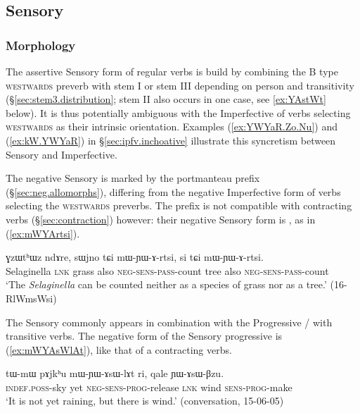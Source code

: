 \subsection{Sensory} \label{sec:sensory}

\subsubsection{Morphology} \label{sec:sensory.morphology}
The assertive Sensory form of regular verbs is build by combining the B type \textsc{westwards}  preverb with stem I or stem III depending on person and transitivity (§\ref{sec:stem3.distribution}; stem II also occurs in one case, see \ref{ex:YAstWt} below). It is thus potentially ambiguous with the Imperfective of verbs selecting \textsc{westwards} as their intrinsic orientation. Examples (\ref{ex:YWYaR.Zo.Nu}) and (\ref{ex:kW.YWYaR}) in §\ref{sec:ipfv.inchoative} illustrate this syncretism between Sensory and Imperfective.

The negative Sensory is marked by the portmanteau prefix  (§\ref{sec:neg.allomorphs}), differing from the negative Imperfective form  of verbs selecting the \textsc{westwards} preverbs. The  prefix is not compatible with contracting verbs (§\ref{sec:contraction}) however: their negative Sensory form is , as in (\ref{ex:mWYArtsi}).

\begin{exe}
\ex \label{ex:mWYArtsi}
\gll ɣzɯtʰɯz ndɤre, sɯjno tɕi mɯ-ɲɯ-ɤ-rtsi, si tɕi mɯ-ɲɯ-ɤ-rtsi. \\
Selaginella \textsc{lnk} grass also \textsc{neg}-\textsc{sens}-\textsc{pass}-count tree also \textsc{neg}-\textsc{sens}-\textsc{pass}-count \\
\glt `The \textit{Selaginella} can be counted neither as a species of grass nor as a tree.' (16-RlWmsWsi)
\end{exe}

The Sensory commonly appears in combination with the Progressive / with transitive verbs. The negative form of the Sensory progressive is  (\ref{ex:mWYAsWlAt}), like that of a contracting verbs.

\begin{exe}
\ex \label{ex:mWYAsWlAt}
\gll   tɯ-mɯ pɤjkʰu mɯ-ɲɯ-ɤsɯ-lɤt ri, qale ɲɯ-ɤsɯ-βzu.\\
\textsc{indef}.\textsc{poss}-sky yet \textsc{neg}-\textsc{sens}-\textsc{prog}-release \textsc{lnk} wind \textsc{sens}-\textsc{prog}-make\\
\glt `It is not yet raining, but there is wind.' (conversation, 15-06-05)
\end{exe}

